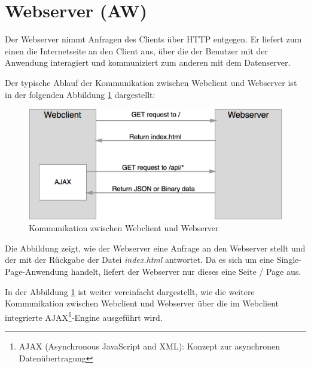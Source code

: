 \clearpage
\section{Webserver (AW)}
\label{section_webserver}
Der Webserver nimmt Anfragen des Clients über HTTP entgegen. Er liefert zum einen die 
Internetseite an den Client aus, über die der Benutzer mit der Anwendung interagiert und 
kommuniziert zum anderen mit dem Datenserver.

Der typische Ablauf der Kommunikation zwischen Webclient und Webserver ist in der 
folgenden Abbildung \ref{fig_webserver_webclient} dargestellt:

\begin{figure}[h]
	\centering
	\includegraphics[width=\textwidth]{bilder/abbildung_webserver_webclient}
	\caption{Kommunikation zwischen Webclient und Webserver}
	\label{fig_webserver_webclient}
\end{figure}

Die Abbildung zeigt, wie der Webserver eine Anfrage an 
den Webserver stellt und der mit der Rückgabe der Datei \textit{index.html} antwortet. Da es sich um eine Single-Page-Anwendung handelt, liefert der Webserver nur dieses eine Seite / Page aus.

In der Abbildung \ref{fig_webserver_webclient} ist weiter vereinfacht dargestellt, wie die weitere Kommunikation zwischen Webclient und Webserver über die im Webclient integrierte AJAX\footnote{AJAX (Asynchronous JavaScript and XML): Konzept zur asynchronen Datenübertragung}-Engine ausgeführt wird.
\clearpage

